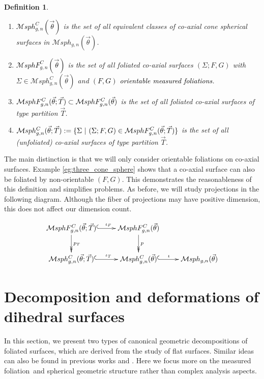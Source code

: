 \documentclass[pdflatex,sn-mathphys]{sn-jnl}%
\numberwithin{equation}{section}
\theoremstyle{thmstyleone}%
\newtheorem{definition}[theorem]{Definition}
\newcommand{\Msphgn}{\mathcal{M}sph_{g,n}(\vec{\theta})}
\newcommand{\MsphgnC}{\mathcal{M}sph^C_{g,n}(\vec{\theta})}
\newcommand{\MsphgnCF}{\mathcal{M}sphF_{g,n}^C(\vec{\theta})}
\newcommand{\MsphgnCT}{\mathcal{M}sph_{g,n}^C(\vec{\theta};\vec{T})}
\newcommand{\MsphgnCFT}{\mathcal{M}sphF_{g,n}^C(\vec{\theta};\vec{T})}
\newcommand{\mfoli}{measured foliation}
\newcommand{\csphsf}{cone spherical surface}
\newcommand{\SYM}{\textcolor{black}}
\newcommand{\EMP}{\textcolor{black}}
\begin{document}
\begin{definition}\label{def:moduli_C} ~
    \begin{enumerate}
        \item \SYM{$\MsphgnC$} is the set of all equivalent classes of co-axial \csphsf s in $\Msphgn$.
        \item \SYM{$\MsphgnCF$} is the set of all foliated co-axial surfaces $(\Sigma;F,G)$ with $\Sigma\in\MsphgnC$ and \EMP{$(F,G)$ orientable \mfoli s}. 
        \item $\SYM{\MsphgnCFT}\subset \MsphgnCF$ is the set of all foliated co-axial surfaces of type partition $\vec{T}$.
        \item $\SYM{\MsphgnCT} :=\{ \Sigma \ \lvert\ (\Sigma;F,G)\in \MsphgnCFT \}$ is the set of all (unfoliated) co-axial surfaces of type partition $\vec{T}$.
    \end{enumerate}
\end{definition}
The main distinction is that we will only consider orientable foliations on co-axial surfaces. Example \ref{eg:three_cone_sphere} shows that a co-axial surface can also be foliated by non-orientable $(F,G)$. This demonstrates the reasonableness of this definition and simplifies problems.
As before, we will study projections in the following diagram. Although the fiber of projections may have positive dimension, this does not affect our dimension count. %

\begin{equation}\label{eq:moduli_spaces_C} \begin{gathered}
    \xymatrix{%
    \MsphgnCFT \ar@{^(->}[r]^{\quad\iota_F} \ar@{->>}[d]^{p_T}    & \MsphgnCF \ar@{->>}[d]^{p}    &\\
    \MsphgnCT \ar@{^(->}[r]^{\quad\iota_T}     & \MsphgnC \ar@{^(->}[r]^{\iota}     & \Msphgn
    }
\end{gathered} \end{equation}

\section{Decomposition and deformations of dihedral surfaces}
In this section, we present two types of canonical geometric decompositions of foliated surfaces, which are derived from the study of flat surfaces.%
Similar ideas can also be found in previous works \cite{Erm20} and \cite{Li19}. Here we focus more on the \mfoli\ and spherical geometric structure rather than complex analysis aspects.
\end{document}
